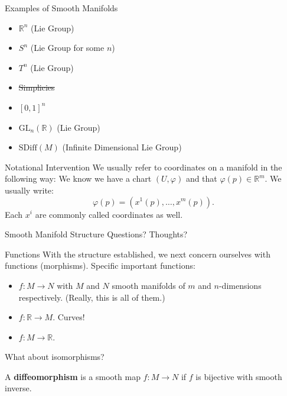 \documentclass[usenames,dvipsnames]{beamer}
\theoremstyle{definition}
\theoremstyle{theorem}
\newcommand{\R}{\mathbb{R}}
\begin{document}
        \begin{frame}{Examples of Smooth Manifolds}
            \begin{itemize}
                \item $\R^n$ (Lie Group)
                \item $S^n$ (Lie Group for some $n$)
                \item $T^n$ (Lie Group)
                \item \st{Simplicies}
                \item \st{$[0,1]^n$}
                \item $\mathrm{GL}_n(\R)$ (Lie Group)
                \item $\mathrm{SDiff}(M)$ (Infinite Dimensional Lie Group)
            \end{itemize}
        \end{frame}
        
        \begin{frame}{Notational Intervention}
            We usually refer to coordinates on a manifold in the following way: We know we have a chart $(U,\varphi)$ and that $\varphi(p)\in \R^m$.  We usually write:
            \[
            \varphi(p)=(x^1(p),\dots,x^m(p)).
            \]
            Each $x^i$ are commonly called coordinates as well.
        \end{frame}
        
        \begin{frame}{Smooth Manifold Structure}
            Questions? Thoughts?
        \end{frame}
        
        \begin{frame}{Functions}
            With the structure established, we next concern ourselves with functions (morphisms). Specific important functions:
            \begin{itemize}
                \item $f\colon M \to N$ with $M$ and $N$ smooth manifolds of $m$ and $n$-dimensions respectively. (Really, this is all of them.)
                \item $f\colon \R \to M$. Curves!
                \item $f\colon M \to \R$. 
            \end{itemize}
            What about isomorphisms?
            \begin{definition}
                A \textbf{diffeomorphism} is a smooth map $f\colon M \to N$ if $f$ is bijective with smooth inverse.
            \end{definition}
        \end{frame}
        
\end{document}
